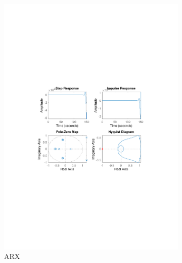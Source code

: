 \documentclass[]{article}
\begin{document}
\begin{figure}[ht]
\centering
\begin{subfigure}{.49\textwidth}
	\centering
	\includegraphics[trim= 10cm 8cm 10cm 8cm, scale=0.4]{figures/3-ARX-Ex2.pdf}
	\caption{ARX}
	\label{fig:Ex2-ARX}
\end{subfigure}
\begin{subfigure}{.49\textwidth}
	\centering

\end{subfigure}
\end{figure}
\end{document}
